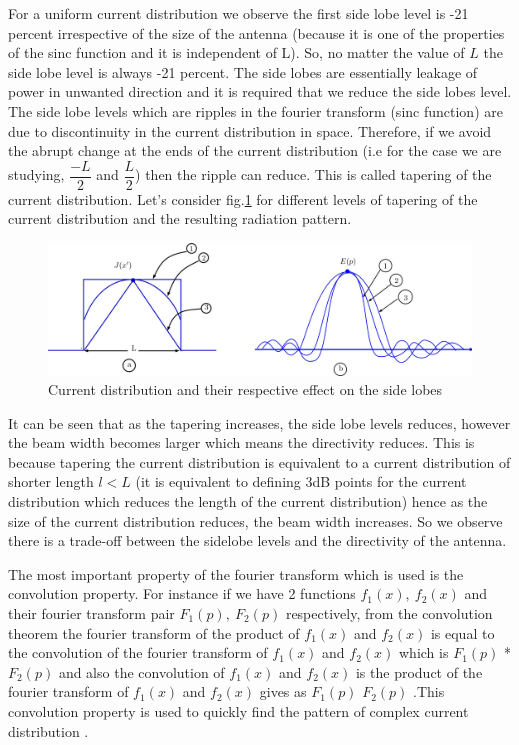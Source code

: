 For a uniform current distribution we observe the first side lobe level is -21 percent irrespective of the size of the antenna (because it is one of the properties of the sinc function and it is independent of L). So, no matter the value of $L$ the side lobe level is always -21 percent. The side lobes are essentially leakage of power in unwanted direction and it is required that we reduce the side lobes level. The side lobe levels which are ripples in the fourier transform (sinc function) are due to discontinuity in the current distribution in space. Therefore, if we avoid the abrupt change at the ends of the current distribution (i.e for the case we are studying, $\dfrac{-L}{2}$ and $\dfrac{L}{2}$) then the ripple can reduce. This is called tapering of the current distribution. Let's consider fig.\ref{fig12} for different levels of tapering of the current distribution and the resulting radiation pattern.
\begin{figure}[h]
\centering
\includegraphics[width=1\linewidth]{./graphics/n12}
\caption{Current distribution and their respective effect on the side lobes}
\label{fig12}
\end{figure}

It can be seen that as the tapering increases, the side lobe levels reduces, however the beam width becomes larger which means the directivity reduces. This is because tapering the current distribution is equivalent to a current distribution of shorter length $l < L$ (it is equivalent to defining 3dB points for the current distribution which reduces the length of the current distribution) hence as the size of the current distribution reduces, the beam width increases. So we observe there is a trade-off between the sidelobe levels and the directivity of the antenna.


The most important property of the fourier transform which is used is the convolution property. For instance if we have 2 functions $f_{1}(x),\ f_2(x)$ and
their fourier transform pair $F_1(p),\ F_2(p)$ respectively, from the convolution theorem the fourier transform of the product of $f_{1}(x)$ and $f_{2}(x)$ is equal to the convolution of the fourier transform of $f_1(x)$ and $f_2(x)$ which is $F_{1}(p)$ * $F_{2}(p)$ and also the convolution of $f_{1}(x)$ and $f_{2}(x)$ is the product of the fourier transform of $f_{1}(x)$ and $f_{2}(x)$ gives as $F_{1}(p)$ $F_{2}(p)$ .This convolution property is used to quickly find the pattern of complex current distribution .


